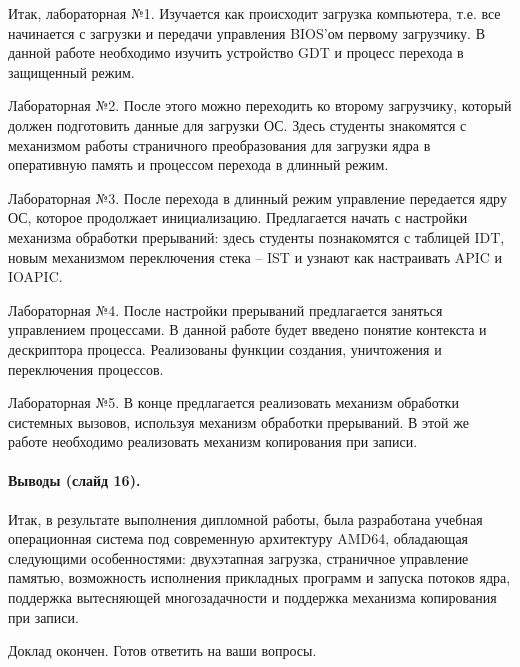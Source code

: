 \documentclass[12pt]{article}
\begin{document}
Итак, лабораторная №1. Изучается как происходит загрузка компьютера, т.е. все начинается с загрузки
и передачи управления BIOS'ом первому загрузчику. В данной работе необходимо изучить устройство GDT
и процесс перехода в защищенный режим.

Лабораторная №2. После этого можно переходить ко второму загрузчику, который должен подготовить данные
для загрузки ОС. Здесь студенты знакомятся с механизмом работы страничного преобразования для загрузки
ядра в оперативную память и процессом перехода в длинный режим.

Лабораторная №3. После перехода в длинный режим управление передается ядру ОС, которое продолжает
инициализацию. Предлагается начать с настройки механизма обработки прерываний: здесь студенты познакомятся
с таблицей IDT, новым механизмом переключения стека -- IST и узнают как настраивать APIC и IOAPIC.

Лабораторная №4. После настройки прерываний предлагается заняться управлением процессами. В данной работе
будет введено понятие контекста и дескриптора процесса. Реализованы функции создания, уничтожения и переключения
процессов.

Лабораторная №5. В конце предлагается реализовать механизм обработки системных вызовов,
используя механизм обработки прерываний. В этой же работе необходимо реализовать механизм
копирования при записи.

\paragraph{Выводы (слайд 16).}
Итак, в результате выполнения дипломной работы, была разработана учебная операционная
система под современную архитектуру AMD64, обладающая следующими особенностями:
двухэтапная загрузка, страничное управление памятью, возможность исполнения прикладных
программ и запуска потоков ядра, поддержка вытесняющей многозадачности и поддержка
механизма копирования при записи.

Доклад окончен. Готов ответить на ваши вопросы.
\end{document}
